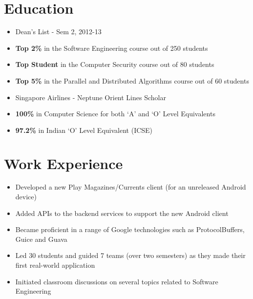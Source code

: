 \documentclass[11pt,a4paper]{moderncv}
\begin{document}
\makecvtitle

\section{Education}
{\begin{itemize}
    \item Dean's List - Sem 2, 2012-13
    \item \textbf{Top 2\%} in the Software Engineering course out of 250 students
    \item \textbf{Top Student} in the Computer Security course out of 80 students
    \item \textbf{Top 5\%} in the Parallel and Distributed Algorithms course out of 60 students
    \item Singapore Airlines - Neptune Orient Lines Scholar
 \end{itemize}}

{\begin{itemize}
            \item \textbf{100\%} in Computer Science for both `A' and `O' Level Equivalents
            \item \textbf{97.2\%} in Indian `O' Level Equivalent (ICSE)
 \end{itemize}}

\section{Work Experience}
{\begin{itemize}
        \item Developed a new Play Magazines/Currents client (for an unreleased Android device)
        \item Added APIs to the backend services to support the new Android client
        \item Became proficient in a range of Google technologies such as ProtocolBuffers, Guice and Guava
 \end{itemize}}
{\begin{itemize}
        \item Led 30 students and guided 7 teams (over two semesters) as they made their first real-world application
        \item Initiated classroom discussions on several topics related to Software Engineering
 \end{itemize}}
\end{document}
